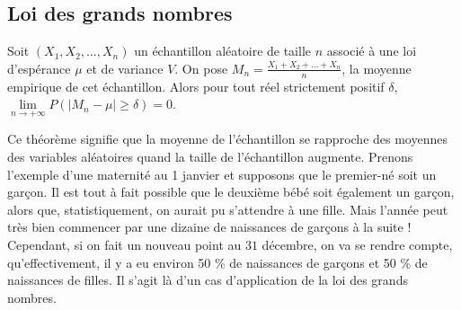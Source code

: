 	\subsection{Loi des grands nombres}

	\begin{formula}
		Soit $(X_1, X_2, \dots, X_n)$ un échantillon aléatoire de taille $n$ associé à une loi d'espérance $\mu$ et de variance $V$. On pose $M_n = \frac{X_1 + X_2 + \dots + X_n}{n}$, la moyenne empirique de cet échantillon.
		\newpar
		Alors pour tout réel strictement positif $\delta$, $\lim\limits_{n \rightarrow +\infty} P(|M_n - \mu| \geq \delta) = 0$.
	\end{formula}

	\begin{tip}
		Ce théorème signifie que la moyenne de l'échantillon se rapproche des moyennes des variables aléatoires quand la taille de l'échantillon augmente.
		\newpar
		Prenons l'exemple d'une maternité au 1\ier{} janvier et supposons que le premier-né soit un garçon. Il est tout à fait possible que le deuxième bébé soit également un garçon, alors que, statistiquement, on aurait pu s'attendre à une fille.
		\newpar
		Mais l'année peut très bien commencer par une dizaine de naissances de garçons à la suite !
		\newpar
		Cependant, si on fait un nouveau point au $31$ décembre, on va se rendre compte, qu'effectivement, il y a eu environ 50 \% de naissances de garçons et 50 \% de naissances de filles. Il s'agit là d'un cas d'application de la loi des grands nombres.
	\end{tip}

